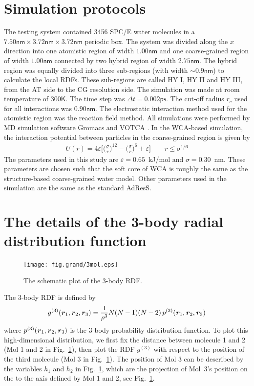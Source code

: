 \documentclass[aip,jcp,a4paper,reprint,onecolumn]{revtex4-1}
\newcommand{\vect}[1]{\textbf{\textit{#1}}}
\begin{document}
\section{Simulation protocols}
\label{app:2}
The testing system contained 3456 SPC/E \cite{berendsen1987missing}
water molecules in a $7.50\textsf{nm}\times 3.72\textsf{nm}\times
3.72\textsf{nm}$ periodic box. The system was divided along the $x$ direction
into one atomistic region of width $1.00\textsf{nm}$ and one
coarse-grained region of width $1.00\textsf{nm}$ connected by two
hybrid region of width $2.75\textsf{nm}$.
The hybrid region was equally divided into three sub-regions (with width $\sim 0.9\textsf{nm}$)
to calculate the local RDFs.
These sub-regions are called HY I, HY II and HY III, from the AT side to the CG resolution side.
The simulation was made at
room temperature of $300\textsf{K}$. The time step was $\Delta t =
0.002\textsf{ps}$. The cut-off radius $r_{c}$ used for all interactions was
$0.90\textsf{nm}$. The electrostatic interaction method used for the
atomistic region was the reaction field method. All simulations were
performed by MD simulation software Gromacs \cite{gromacs}
and VOTCA \cite{ruehle2009versatile}.
In the WCA-based simulation, the interaction potential between particles in the coarse-grained region is given by
\begin{align}
  U(r) = 4\varepsilon
  \big[
  \big(\frac\sigma r\big)^{12}
  -
  \big(\frac\sigma r\big)^{6}
  + \varepsilon
  \big]
  \qquad  r\leq \sigma^{1/6}
\end{align}
The parameters used in this study are $\varepsilon = 0.65$~\textsf{kJ/mol}
and $\sigma = 0.30$~\textsf{nm}. These parameters are chosen such that
the soft core of WCA is roughly the same as the structure-based coarse-grained
water model.
Other parameters used in the simulation are the
same as the standard AdResS.



\section{The details of the 3-body radial distribution function}
\label{app:3}

\begin{figure}
  \centering
  \texttt{[image: fig.grand/3mol.eps]}
  \caption{The schematic plot of the 3-body RDF.}\label{fig:tmp3}
\end{figure}



The 3-body RDF is defined by
\begin{align}
  g^{(3)}(\vect r_1, \vect r_2, \vect r_3) =
  \frac{1}{\rho^3}N(N-1)(N-2) \,p^{(3)}(\vect r_1, \vect r_2, \vect r_3) 
\end{align}
where $p^{(3)}(\vect r_1, \vect r_2, \vect r_3) $ is the 3-body
probability distribution function. To plot this high-dimensional
distribution, we first fix the distance between molecule 1 and 2 (Mol
1 and 2 in Fig.~\ref{fig:tmp3}), then plot the RDF $g^{(3)}$ with
respect to the position of the third molecule (Mol 3 in
Fig.~\ref{fig:tmp3}).  The position of Mol 3 can be described by
the variables $h_1$ and $h_2$ in Fig.~\ref{fig:tmp3}, which are
the projection of Mol~3's position on the to the
axis defined by Mol 1 and 2, see Fig.~\ref{fig:tmp3}.
\end{document}
